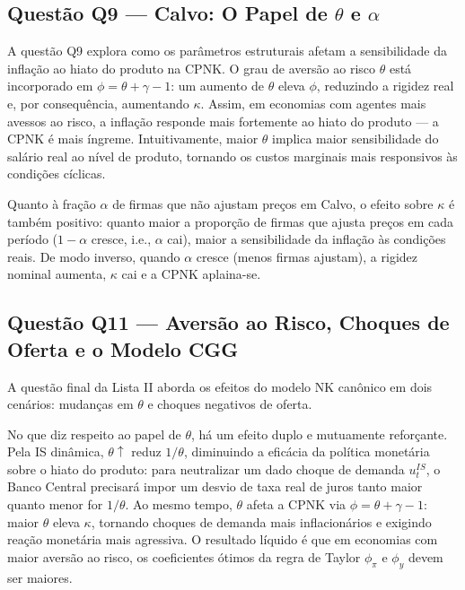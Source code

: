 \documentclass[12pt, a4paper]{article}
\begin{document}
\subsection{Questão Q9 --- Calvo: O Papel de $\theta$ e $\alpha$}

A questão Q9 explora como os parâmetros estruturais afetam a sensibilidade da inflação ao hiato do produto na CPNK. O grau de aversão ao risco $\theta$ está incorporado em $\phi = \theta + \gamma - 1$: um aumento de $\theta$ eleva $\phi$, reduzindo a rigidez real e, por consequência, aumentando $\kappa$. Assim, em economias com agentes mais avessos ao risco, a inflação responde mais fortemente ao hiato do produto — a CPNK é mais íngreme. Intuitivamente, maior $\theta$ implica maior sensibilidade do salário real ao nível de produto, tornando os custos marginais mais responsivos às condições cíclicas.

Quanto à fração $\alpha$ de firmas que não ajustam preços em Calvo, o efeito sobre $\kappa$ é também positivo: quanto maior a proporção de firmas que ajusta preços em cada período ($1-\alpha$ cresce, i.e., $\alpha$ cai), maior a sensibilidade da inflação às condições reais. De modo inverso, quando $\alpha$ cresce (menos firmas ajustam), a rigidez nominal aumenta, $\kappa$ cai e a CPNK aplaina-se.

\subsection{Questão Q11 --- Aversão ao Risco, Choques de Oferta e o Modelo CGG}

A questão final da Lista II aborda os efeitos do modelo NK canônico em dois cenários: mudanças em $\theta$ e choques negativos de oferta.

No que diz respeito ao papel de $\theta$, há um efeito duplo e mutuamente reforçante. Pela IS dinâmica, $\theta\uparrow$ reduz $1/\theta$, diminuindo a eficácia da política monetária sobre o hiato do produto: para neutralizar um dado choque de demanda $u_t^{IS}$, o Banco Central precisará impor um desvio de taxa real de juros tanto maior quanto menor for $1/\theta$. Ao mesmo tempo, $\theta$ afeta a CPNK via $\phi = \theta+\gamma-1$: maior $\theta$ eleva $\kappa$, tornando choques de demanda mais inflacionários e exigindo reação monetária mais agressiva. O resultado líquido é que em economias com maior aversão ao risco, os coeficientes ótimos da regra de Taylor $\phi_\pi$ e $\phi_y$ devem ser maiores.
\end{document}
